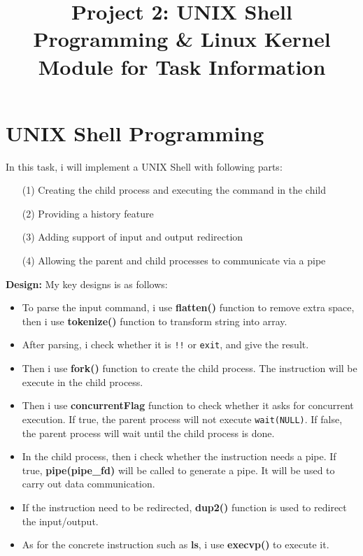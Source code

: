 \documentclass[UTF8,10pt,a4paper]{article}
\title{Project 2: UNIX Shell Programming \& Linux Kernel Module for Task Information}
\date{}
\theoremstyle{Problem}
\theoremstyle{Solution}
\begin{document}
\maketitle
\thispagestyle{FirstPageStyle}


\section{UNIX Shell Programming}
In this task, i will implement a UNIX Shell with following parts:
\begin{itemize}
    \item[(1)] Creating the child process and executing the command in the child
    \item[(2)] Providing a history feature
    \item[(3)] Adding support of input and output redirection
    \item[(4)] Allowing the parent and child processes to communicate via a pipe
\end{itemize}

\textbf{Design:} My key designs is as follows:
\begin{itemize}
    \item To parse the input command, i use \textbf{flatten()} function to remove extra space, then i use \textbf{tokenize()} function to transform string into array.
    \item After parsing, i check whether it is \texttt{!!} or \texttt{exit}, and give the result.
    \item Then i use \textbf{fork()} function to create the child process. The instruction will be execute in the child process.
    \item Then i use \textbf{concurrentFlag} function to check whether it asks for concurrent execution. If true, the parent process will not execute \texttt{wait(NULL)}. If false, the parent process will wait until the child process is done.
    \item In the child process, then i check whether the instruction needs a pipe. If true, \textbf{pipe(pipe\_fd)} will be called to generate a pipe. It will be used to carry out data communication.
    \item If the instruction need to be redirected, \textbf{dup2()} function is used to redirect the input/output.
    \item As for the concrete instruction such as \textbf{ls}, i use \textbf{execvp()} to execute it.
    
\end{itemize}
\end{document}
